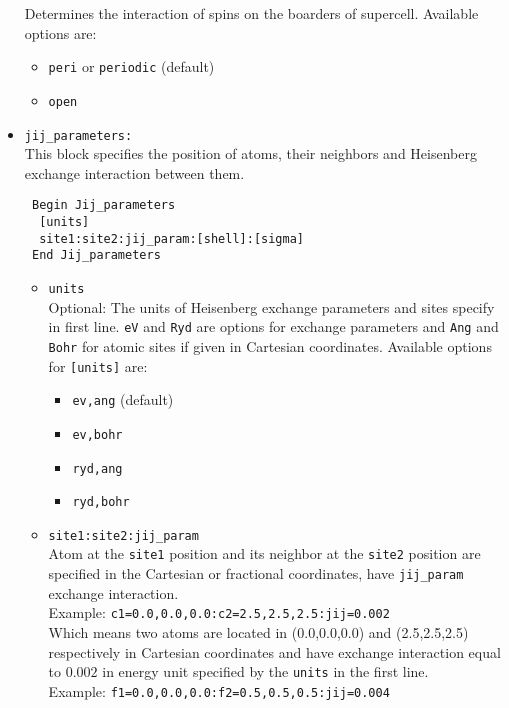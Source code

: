 \documentclass[10pt]{report}
\begin{document}
\begin{itemize}
Determines the interaction of spins on the boarders of supercell.
Available options are:
\begin{itemize} [label=\adfhalfrightarrowhead]
\item {\tt peri} or {\tt periodic} (default)
\item {\tt open}
\end{itemize}
\item {\tt jij\_parameters: }\\
This block specifies the position of atoms, their neighbors and Heisenberg exchange interaction between them.    \\
\begin{verbatim}
 Begin Jij_parameters
  [units]
  site1:site2:jij_param:[shell]:[sigma]
 End Jij_parameters
\end{verbatim}
\begin{itemize} [label=$\diamond$]
\item {\tt units}\\
Optional: The units of Heisenberg exchange parameters and sites specify in first line. 
{\tt eV} and {\tt Ryd} are options for 
exchange parameters and {\tt Ang} and {\tt Bohr} for atomic sites if given
in Cartesian coordinates. Available options for {\tt [units]} are: 
\begin{itemize} [label=\adfhalfrightarrowhead]
\item {\tt ev,ang} (default)
\item {\tt ev,bohr}
\item {\tt ryd,ang}
\item {\tt ryd,bohr}
\end{itemize}
\item {\tt site1:site2:jij\_param} \\
Atom at the {\tt site1} position and its neighbor at the {\tt site2} position are
 specified in the Cartesian or fractional coordinates, have {\tt jij\_param} exchange interaction.\\
Example: {\tt c1=0.0,0.0,0.0:c2=2.5,2.5,2.5:jij=0.002} \\
Which means two atoms 
are located in (0.0,0.0,0.0) and (2.5,2.5,2.5) respectively  
in Cartesian coordinates and
have exchange interaction equal to $0.002$
in energy unit specified by the {\tt units} in the first line. \\
Example: {\tt f1=0.0,0.0,0.0:f2=0.5,0.5,0.5:jij=0.004}\\

\end{itemize}
\end{itemize}
\end{document}
